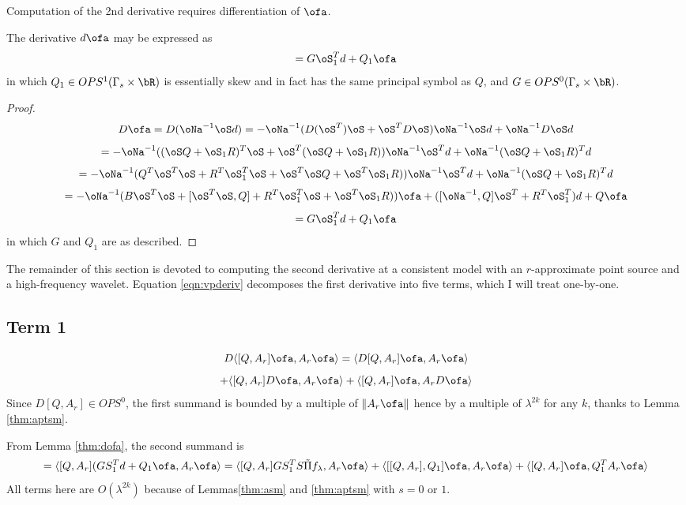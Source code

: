 Computation of the 2nd derivative requires differentiation of $\ofa$.
\begin{lemma}
\label{thm:dofa}
The derivative $d\ofa$ may be expressed as
\begin{equation}
\label{eqn:dofa}
= G \oS_1^T d + Q_1 \ofa 
\end{equation}
in which $Q_1 \in OPS^1(\Gamma_s \times \bR)$ is essentially skew and in fact has the same principal symbol as $Q$, and $G \in OPS^0(\Gamma_s \times \bR)$.
\end{lemma}
\begin{proof}
\[
D\ofa = D(\oNa^{-1}\oS d) = -\oNa^{-1}(D(\oS^T)\oS + \oS^TD\oS)\oNa^{-1}\oS d
+ \oNa^{-1}D\oS d
\]
\[
=-\oNa^{-1}((\oS Q + \oS_1 R)^T\oS +\oS^T(\oS Q + \oS_1 R))\oNa^{-1}\oS^Td
+\oNa^{-1}(\oS Q + \oS_1 R)^Td
\]
\[
=-\oNa^{-1}(Q^T \oS^T\oS + R^T\oS_1^T\oS +\oS^T\oS Q + \oS^T\oS_1 R))\oNa^{-1}\oS^Td +\oNa^{-1}(\oS Q + \oS_1 R)^Td
\]
\[
=-\oNa^{-1}(B\oS^T\oS + [\oS^T\oS,Q] + R^T\oS_1^T\oS + \oS^T\oS_1 R))\ofa +([\oNa^{-1},Q]\oS^T+ R^T\oS_1^T)d + Q\ofa
\]
\[
= G \oS_1^T d + Q_1 \ofa 
\]
in which $G$ and $Q_1$ are as described.
\end{proof}

The remainder of this section is devoted to computing the second derivative at a consistent model with an $r$-approximate point source and a high-frequency wavelet. Equation \ref{eqn:vpderiv} decomposes the first derivative into five terms, which I will treat one-by-one.

\subsection{Term 1}
\[
D\langle [Q,A_r] \ofa, A_r\ofa \rangle = \langle D[Q,A_r]\ofa,A_r\ofa\rangle 
\]
\[+
\langle [Q,A_r] D\ofa, A_r \ofa \rangle + \langle [Q,A_r]\ofa, A_r D\ofa \rangle
\]
Since $D[Q,A_r] \in OPS^0$, the first summand is bounded by a multiple of $\|A_r\ofa\|$ hence by a multiple of $\lambda^{2k}$ for any $k$, thanks to Lemma \ref{thm:aptsm}. 

From Lemma \ref{thm:dofa}, the second summand is 
\[
= \langle [Q,A_r](GS_1^Td+Q_1\ofa,A_r\ofa \rangle = \langle [Q,A_r]GS_1^TS \tilde{\Pi}f_{\lambda},A_r\ofa \rangle +\langle [[Q,A_r],Q_1]\ofa,A_r\ofa \rangle + \langle [Q,A_r]\ofa,Q_1^TA_r\ofa\rangle
\]
All terms here are $O(\lambda^{2k})$ because of Lemmas\ref{thm:asm} and \ref{thm:aptsm} with $s=0$ or $1$.

